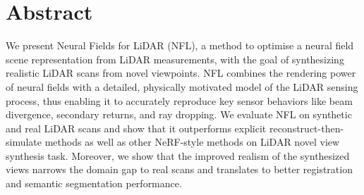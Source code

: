 \section*{Abstract}
We present Neural Fields for LiDAR (NFL), a method to optimise a neural field scene representation from LiDAR measurements, with the goal of synthesizing realistic LiDAR scans from novel viewpoints. 
NFL combines the rendering power of neural fields with a detailed, physically motivated model of the LiDAR sensing process, thus enabling it to accurately reproduce key sensor behaviors like beam divergence, secondary returns, and ray dropping.
We evaluate NFL on synthetic and real LiDAR scans and show that it outperforms explicit reconstruct-then-simulate methods as well as other NeRF-style methods on LiDAR novel view synthesis task. Moreover, we show that the improved realism of the synthesized views narrows the domain gap to real scans and translates to better registration and semantic segmentation performance.